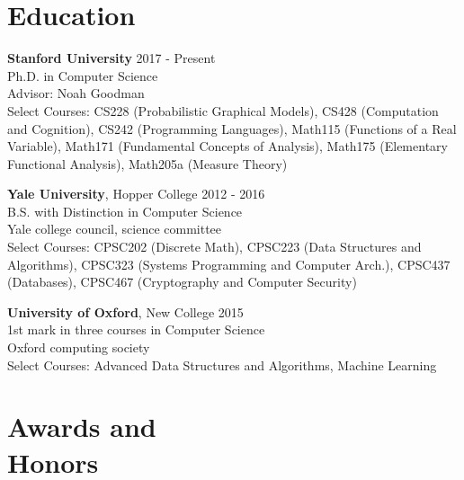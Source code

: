 \documentclass[margin, 10pt]{res} %
\begin{document}
\begin{resume}


\section{Education}

\textbf{Stanford University} \hfill 2017 - Present \\
Ph.D. in Computer Science \\
Advisor: Noah Goodman \\
Select Courses: CS228 (Probabilistic Graphical Models), CS428 (Computation and Cognition), CS242 (Programming Languages), Math115 (Functions of a Real Variable), Math171 (Fundamental Concepts of Analysis), Math175 (Elementary Functional Analysis), Math205a (Measure Theory)

\textbf{Yale University}, Hopper College \hfill 2012 - 2016 \\
B.S. with Distinction in Computer Science \\
Yale college council, science committee \\
Select Courses: CPSC202 (Discrete Math), CPSC223 (Data Structures and Algorithms), CPSC323 (Systems Programming and Computer Arch.), CPSC437 (Databases), CPSC467 (Cryptography and Computer Security)

\textbf{University of Oxford}, New College \hfill 2015 \\
1st mark in three courses in Computer Science\\
Oxford computing society \\
Select Courses: Advanced Data Structures and Algorithms, Machine Learning


\section{Awards and \\ Honors}


\end{resume}
\end{document}
